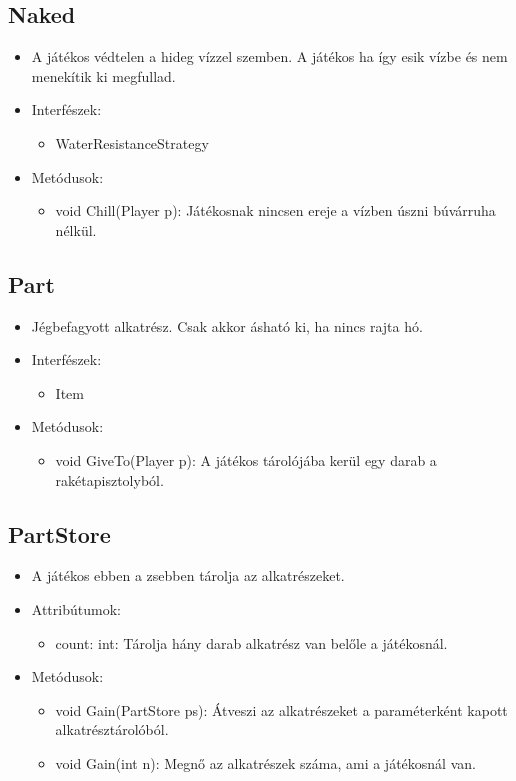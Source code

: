 \subsection{Naked}
\begin{itemize}
	\item A játékos védtelen a hideg vízzel szemben. A játékos ha így esik vízbe és nem menekítik ki megfullad.
	\item Interfészek:
	\begin{itemize}
		\item WaterResistanceStrategy
	\end{itemize}
	\item Metódusok:
	\begin{itemize}
		\item void Chill(Player p): Játékosnak nincsen ereje a vízben úszni búvárruha nélkül.
	\end{itemize}
\end{itemize}

\subsection{Part}
\begin{itemize}
	\item Jégbefagyott alkatrész. Csak akkor ásható ki, ha nincs rajta hó.
	\item Interfészek:
	\begin{itemize}
		\item Item
	\end{itemize}
	\item Metódusok:
	\begin{itemize}
		\item void GiveTo(Player p): A játékos tárolójába kerül egy darab a rakétapisztolyból.
	\end{itemize}
\end{itemize}

\subsection{PartStore}
\begin{itemize}
	\item A játékos ebben a zsebben tárolja az alkatrészeket.
	\item Attribútumok:
	\begin{itemize}
		\item count: int: Tárolja hány darab alkatrész van belőle a játékosnál.
	\end{itemize}
	\item Metódusok:
	\begin{itemize}
		\item void Gain(PartStore ps): Átveszi az alkatrészeket a paraméterként kapott alkatrésztárolóból.
		\item void Gain(int n): Megnő az alkatrészek száma, ami a játékosnál van.
	\end{itemize}
\end{itemize}

